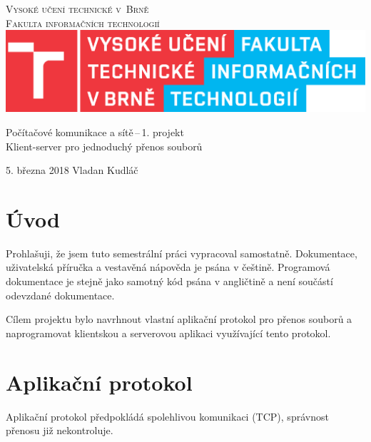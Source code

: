 \documentclass[11pt,a4paper]{article}
\author{Vladan Kudláč}
\begin{document}
\begin{titlepage}
\begin{center}
	\textsc{
		{\Huge Vysoké učení technické v~Brně} \\
		\medskip
		{\huge Fakulta informačních technologií} \\
	}
	\includegraphics{logoFIT.eps}
	
	{\LARGE Počítačové komunikace a sítě\,--\,1. projekt} \\
	\medskip
	{\Huge Klient-server pro jednoduchý přenos souborů}
	
	{\Large 5. března 2018 \hfill Vladan Kudláč}
\end{center}
\end{titlepage}

\tableofcontents
\pagebreak

\section{Úvod}
Prohlašuji, že jsem tuto semestrální práci vypracoval samostatně. Dokumentace, uživatelská příručka a vestavěná nápověda je psána v češtině. Programová dokumentace je stejně jako samotný kód psána v angličtině a není součástí odevzdané dokumentace.

Cílem projektu bylo navrhnout vlastní aplikační protokol pro přenos souborů a naprogramovat klientskou a serverovou aplikaci využívající tento protokol.

\section{Aplikační protokol}
Aplikační protokol předpokládá spolehlivou komunikaci (TCP), správnost přenosu již nekontroluje.
\end{document}
